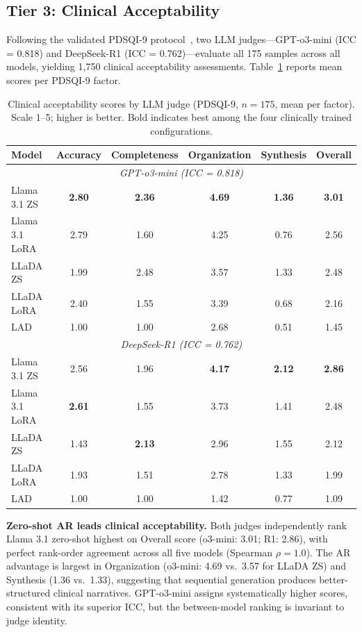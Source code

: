\documentclass[11pt]{article}
\begin{document}
\subsection{Tier 3: Clinical Acceptability}

Following the validated PDSQI-9 protocol~\citep{croxford2025pdsqi,
croxford2025evaluating}, two LLM judges---GPT-o3-mini (ICC = 0.818) and
DeepSeek-R1 (ICC = 0.762)---evaluate all 175 samples across all models,
yielding 1,750 clinical acceptability assessments.
Table~\ref{tab:pdsqi} reports mean scores per PDSQI-9 factor.

\begin{table}[htbp]
\small
\centering
\begin{tabular}{lccccc}
\hline
\textbf{Model} & \textbf{Accuracy} & \textbf{Completeness} & \textbf{Organization} & \textbf{Synthesis} & \textbf{Overall} \\
\hline
\multicolumn{6}{c}{\textit{GPT-o3-mini (ICC = 0.818)}} \\
\hline
Llama 3.1 ZS  & \textbf{2.80} & \textbf{2.36} & \textbf{4.69} & \textbf{1.36} & \textbf{3.01} \\
Llama 3.1 LoRA & 2.79 & 1.60 & 4.25 & 0.76 & 2.56 \\
LLaDA ZS       & 1.99 & 2.48 & 3.57 & 1.33 & 2.48 \\
LLaDA LoRA     & 2.40 & 1.55 & 3.39 & 0.68 & 2.16 \\
\hline
LAD            & 1.00 & 1.00 & 2.68 & 0.51 & 1.45 \\
\hline
\multicolumn{6}{c}{\textit{DeepSeek-R1 (ICC = 0.762)}} \\
\hline
Llama 3.1 ZS   & 2.56 & 1.96 & \textbf{4.17} & \textbf{2.12} & \textbf{2.86} \\
Llama 3.1 LoRA & \textbf{2.61} & 1.55 & 3.73 & 1.41 & 2.48 \\
LLaDA ZS       & 1.43 & \textbf{2.13} & 2.96 & 1.55 & 2.12 \\
LLaDA LoRA     & 1.93 & 1.51 & 2.78 & 1.33 & 1.99 \\
\hline
LAD            & 1.00 & 1.00 & 1.42 & 0.77 & 1.09 \\
\hline
\end{tabular}
\caption{Clinical acceptability scores by LLM judge (PDSQI-9, $n=175$, mean per factor). Scale 1--5; higher is better. Bold indicates best among the four clinically trained configurations.}
\label{tab:pdsqi}
\end{table}

\textbf{Zero-shot AR leads clinical acceptability.}
Both judges independently rank Llama 3.1 zero-shot highest on Overall score
(o3-mini: 3.01; R1: 2.86), with perfect rank-order agreement across all five
models (Spearman $\rho = 1.0$). The AR advantage is largest in Organization
(o3-mini: 4.69 vs.\ 3.57 for LLaDA ZS) and Synthesis (1.36 vs.\ 1.33),
suggesting that sequential generation produces better-structured clinical
narratives. GPT-o3-mini assigns systematically higher scores, consistent
with its superior ICC, but the between-model ranking is invariant to judge
identity.
\end{document}
